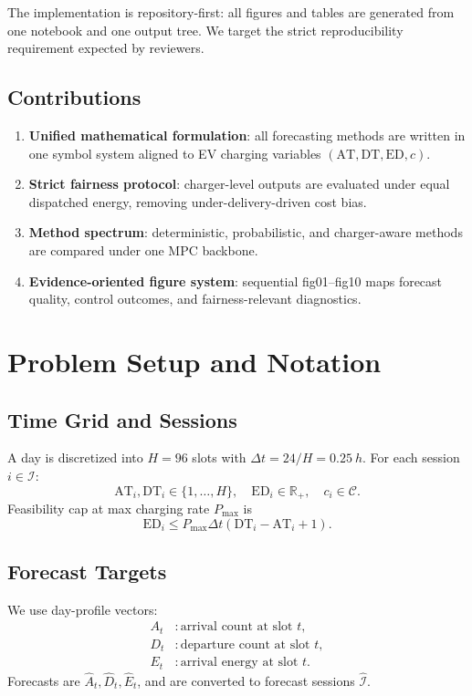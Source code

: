 \documentclass[journal]{IEEEtran}
\newcommand{\AT}{\mathrm{AT}}
\newcommand{\DT}{\mathrm{DT}}
\newcommand{\ED}{\mathrm{ED}}
\newcommand{\R}{\mathbb{R}}
\begin{document}
The implementation is repository-first: all figures and tables are generated from one notebook and one output tree. We target the strict reproducibility requirement expected by reviewers.

\subsection{Contributions}
\begin{enumerate}
    \item \textbf{Unified mathematical formulation}: all forecasting methods are written in one symbol system aligned to EV charging variables $(\AT,\DT,\ED,c)$.
    \item \textbf{Strict fairness protocol}: charger-level outputs are evaluated under equal dispatched energy, removing under-delivery-driven cost bias.
    \item \textbf{Method spectrum}: deterministic, probabilistic, and charger-aware methods are compared under one MPC backbone.
    \item \textbf{Evidence-oriented figure system}: sequential fig01--fig10 maps forecast quality, control outcomes, and fairness-relevant diagnostics.
\end{enumerate}

\section{Problem Setup and Notation}

\subsection{Time Grid and Sessions}
A day is discretized into $H=96$ slots with $\Delta t = 24/H = \SI{0.25}{h}$. For each session $i \in \mathcal{I}$:
\begin{equation}
\AT_i,\DT_i \in \{1,\dots,H\},\quad \ED_i \in \R_{+},\quad c_i \in \mathcal{C}.
\end{equation}
Feasibility cap at max charging rate $P_{\max}$ is
\begin{equation}
\ED_i \le P_{\max}\Delta t(\DT_i-\AT_i+1).
\end{equation}

\subsection{Forecast Targets}
We use day-profile vectors:
\begin{align}
A_t &: \text{arrival count at slot }t,\\
D_t &: \text{departure count at slot }t,\\
E_t &: \text{arrival energy at slot }t.
\end{align}
Forecasts are $\hat{A}_t,\hat{D}_t,\hat{E}_t$, and are converted to forecast sessions $\hat{\mathcal{I}}$.
\end{document}
